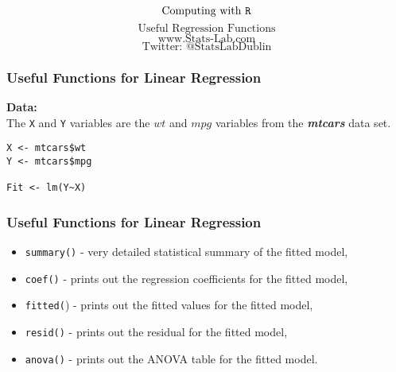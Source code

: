 \documentclass{beamer}
\begin{document}
\begin{frame}
\huge
\[\mbox{Computing with \texttt{R}}\]
\[\mbox{Useful Regression Functions}\]
\bigskip
\LARGE
\[\mbox{www.Stats-Lab.com}\]
\[\mbox{Twitter: @StatsLabDublin}\]
\end{frame}
\begin{frame}[fragile]
\frametitle{Useful Functions for Linear Regression}
\Large
\vspace{-1cm}
\textbf{Data:} \\
The \texttt{X} and \texttt{Y} variables are the $wt$ and $mpg$ variables from the \textit{\textbf{\textit{mtcars}}} data set.

\begin{framed}
\begin{verbatim}
X <- mtcars$wt
Y <- mtcars$mpg

Fit <- lm(Y~X)
\end{verbatim}
\end{framed}
\end{frame}
\begin{frame}
\frametitle{Useful Functions for Linear Regression}
\Large
\begin{itemize}
\item \texttt{summary()} - very detailed statistical summary of the fitted model,
\item \texttt{coef()} - prints out the regression coefficients for the fitted model,
\item \texttt{fitted(}) - prints out the fitted values for the fitted model,
\item \texttt{resid()} - prints out the residual for the fitted model,
\item \texttt{anova()} - prints out the ANOVA table for the fitted model.
\end{itemize}
\end{frame}
\end{document}
